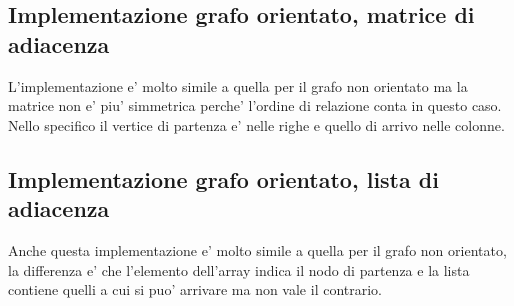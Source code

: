 \documentclass{article}
\begin{document}
\subsection{Implementazione grafo orientato, matrice di adiacenza}
L'implementazione e' molto simile a quella per il grafo non orientato ma la matrice non e' piu' simmetrica perche' l'ordine 
di relazione conta in questo caso. Nello specifico il vertice di partenza e' nelle righe e quello di arrivo nelle colonne.

\subsection{Implementazione grafo orientato, lista di adiacenza}
Anche questa implementazione e' molto simile a quella per il grafo non orientato, la differenza e' che l'elemento dell'array indica 
il nodo di partenza e la lista contiene quelli a cui si puo' arrivare ma non vale il contrario.
\end{document}
